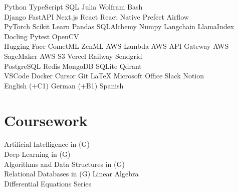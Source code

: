 \documentclass[]{tex/deedy-resume-openfont}
\begin{document}
\begin{minipage}[t]{0.32\textwidth}
Python \textbullet{} 
TypeScript \textbullet{} 
SQL \textbullet{} 
Julia \textbullet{} 
Wolfram \textbullet{} 
Bash \\[4pt]

Django \textbullet{} 
FastAPI \textbullet{} 
Next.js \textbullet{} 
React \textbullet{} 
React Native \textbullet{} 
Prefect \textbullet{} 
Airflow \\[4pt]


PyTorch \textbullet{} 
Scikit Learn \textbullet{} 
Pandas \textbullet{} 
SQLAlchemy \textbullet{} 
Numpy \textbullet{} 
Langchain \textbullet{} 
LlamaIndex \textbullet{} 
Docling \textbullet{} 
Pytest \textbullet{} 
OpenCV\\[4pt]

Hugging Face \textbullet{} 
CometML \textbullet{} 
ZenML \textbullet{} 
AWS Lambda \textbullet{} 
AWS API Gateway \textbullet{} 
AWS SageMaker \textbullet{} 
AWS S3 \textbullet{} 
Vercel \textbullet{} 
Railway \textbullet{} 
Sendgrid \\[4pt]

PostgreSQL \textbullet{} 
Redis \textbullet{} 
MongoDB \textbullet{} 
SQLite \textbullet{} 
Qdrant \\[4pt]

VSCode \textbullet{} 
Docker \textbullet{} 
Cursor \textbullet{} 
Git \textbullet{} 
\LaTeX{} \textbullet{} 
Microsoft Office \textbullet{} 
Slack \textbullet{} 
Notion \\[6pt]

English ($+$C1) \textbullet{} German ($+$B1) \textbullet{} Spanish


\section{Coursework}
Artificial Intelligence in  (G)\\
Deep Learning in (G)\\
Algorithms and Data Structures in  (G)\\
Relational Databases in  (G)
Linear Algebra\\
Differential Equations Series\\


\end{minipage}
\end{document}
